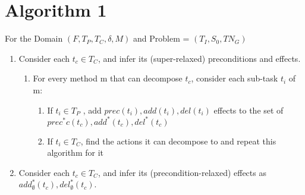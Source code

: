 \section{Algorithm 1}
For the Domain $(F, T_P, T_C, \delta, M)$ and Problem = $(T_I, S_0, TN_G)$
\begin{enumerate}
	\item Consider each $t_c \in T_C$, and infer its (super-relaxed) preconditions and effects.
	\begin{enumerate}
		\item For every method m that can decompose $t_c$, consider each sub-task $t_i$ of m:
		\begin{enumerate}
			\item If $t_i \in T_P$ , add $prec(t_i), add(t_i), del(t_i)$ effects to the set of $prec^{*}c(t_c), add^{*}(t_c), del^{*}(t_c)$
			\item If $t_i \in T_C$, find the actions it can decompose to and repeat this algorithm for it
		\end{enumerate}
	\end{enumerate}

	\item Consider each $t_c \in T_C$, and infer its (precondition-relaxed) effects as  $add^{*}_{\emptyset}(t_c), del^{*}_{\emptyset}(t_c)$.


\end{enumerate}
